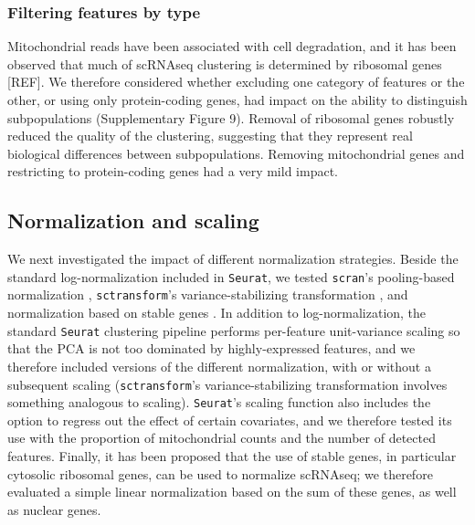 \documentclass{bmcart}
\begin{document}
\subsubsection*{Filtering features by type}

Mitochondrial reads have been associated with cell degradation, and it has been observed that much of scRNAseq clustering is determined by ribosomal genes [REF]. We therefore considered whether excluding one category of features or the other, or using only protein-coding genes, had impact on the ability to distinguish subpopulations (Supplementary Figure 9). Removal of ribosomal genes robustly reduced the quality of the clustering, suggesting that they represent real biological differences between subpopulations. Removing mitochondrial genes and restricting to protein-coding genes had a very mild impact.

\subsection*{Normalization and scaling}

We next investigated the impact of different normalization strategies. Beside the standard log-normalization included in \texttt{Seurat}, we tested \texttt{scran}'s pooling-based normalization \citep{lunPooling2016}, \texttt{sctransform}'s variance-stabilizing transformation \citep{hafemeisterSCtransform2019}, and normalization based on stable genes \citep{linStableGenes2018, deekeStablyExpressed2018}. 
In addition to log-normalization, the standard \texttt{Seurat} clustering pipeline performs per-feature unit-variance scaling so that the PCA is not too dominated by highly-expressed features, and we therefore included versions of the different normalization, with or without a subsequent scaling (\texttt{sctransform}'s variance-stabilizing transformation involves something analogous to scaling). 
\texttt{Seurat}'s scaling function also includes the option to regress out the effect of certain covariates, and we therefore tested its use with the proportion of mitochondrial counts and the number of detected features. Finally, it has been proposed that the use of stable genes, in particular cytosolic ribosomal genes, can be used to normalize scRNAseq; we therefore evaluated a simple linear normalization based on the sum of these genes, as well as nuclear genes.
\end{document}
